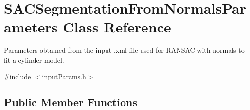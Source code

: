\hypertarget{classSACSegmentationFromNormalsParameters}{\section{S\-A\-C\-Segmentation\-From\-Normals\-Parameters Class Reference}
\label{classSACSegmentationFromNormalsParameters}
}


Parameters obtained from the input .xml file used for R\-A\-N\-S\-A\-C with normals to fit a cylinder model.  




{\ttfamily \#include $<$input\-Params.\-h$>$}

\subsection*{Public Member Functions}

